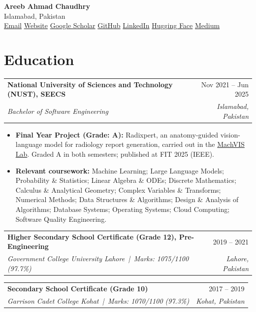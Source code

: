 \documentclass[10pt,letterpaper]{article}
\makeatletter
\newcommand{\entry}[4]{%
  \begin{tabularx}{\textwidth}{@{}X r@{}}
    \textbf{#1} & #2 \\
    \textit{#3} & \textit{#4} \\
  \end{tabularx}}
\newcommand{\sep}{\;\textbar\;}
\makeatother
\begin{document}
\begin{center}
  {\fontsize{24}{28}\selectfont\bfseries Areeb Ahmad Chaudhry}\\[6pt]
  Islamabad, Pakistan\\[3pt]
  \href{mailto:chaudhry.bese21seecs@seecs.edu.pk}{Email} \sep
  \href{https://areebahmad-02.github.io}{Website} \sep
  \href{https://scholar.google.com/citations?user=gaDnnFwAAAAJ}{Google Scholar} \sep
  \href{https://github.com/AreebAhmad-02}{GitHub} \sep
  \href{https://linkedin.com/in/areeb-ahmad02}{LinkedIn} \sep
  \href{https://huggingface.co/Areeb-02}{Hugging Face} \sep
  \href{https://medium.com/@ahmadareeb3026}{Medium}
\end{center}

\section{Education}
\entry{National University of Sciences and Technology (NUST), SEECS}{Nov 2021 -- Jun 2025}{Bachelor of Software Engineering}{Islamabad, Pakistan}
\begin{itemize}
  \item \textbf{Final Year Project (Grade: A):} Radixpert, an anatomy-guided vision-language model for radiology report generation, carried out in the \href{https://vision.seecs.edu.pk/}{MachVIS Lab}. Graded A in both semesters; published at FIT 2025 (IEEE).
  \item \textbf{Relevant coursework:} Machine Learning; Large Language Models; Probability \& Statistics; Linear Algebra \& ODEs; Discrete Mathematics; Calculus \& Analytical Geometry; Complex Variables \& Transforms; Numerical Methods; Data Structures \& Algorithms; Design \& Analysis of Algorithms; Database Systems; Operating Systems; Cloud Computing; Software Quality Engineering.
\end{itemize}
\vspace{6pt}
\entry{Higher Secondary School Certificate (Grade 12), Pre-Engineering}{2019 -- 2021}{Government College University Lahore \,|\, Marks: 1075/1100 (97.7\%)}{Lahore, Pakistan}
\entry{Secondary School Certificate (Grade 10)}{2017 -- 2019}{Garrison Cadet College Kohat \,|\, Marks: 1070/1100 (97.3\%)}{Kohat, Pakistan}

\end{document}
